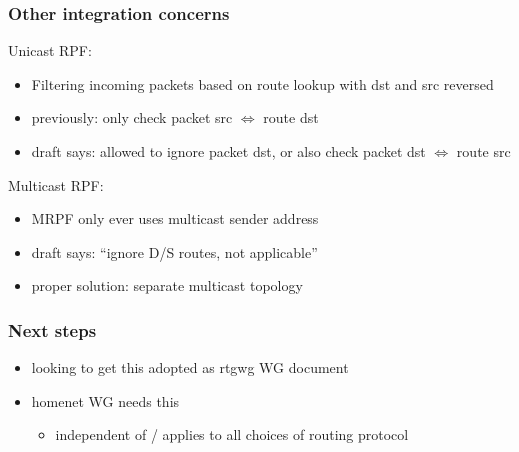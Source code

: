 \documentclass[14pt]{beamer}
\begin{document}
\begin{frame}
  \frametitle{Other integration concerns}

  Unicast RPF:
  \begin{itemize}
    \item Filtering incoming packets based on route lookup with dst and src reversed
    \item previously: only check packet src $\Leftrightarrow$ route dst
    \item draft says: allowed to ignore packet dst, or also check packet dst $\Leftrightarrow$ route src
  \end{itemize}
  \vspace{5mm}
  Multicast RPF:
  \begin{itemize}
    \item MRPF only ever uses multicast sender address
    \item draft says: ``ignore D/S routes, not applicable''
    \item proper solution: separate multicast topology
  \end{itemize}
\end{frame}

\begin{frame}
  \frametitle{Next steps}
  \begin{itemize}
    \item looking to get this adopted as rtgwg WG document
    \item homenet WG needs this
    \begin{itemize}
      \item independent of / applies to all choices of routing protocol
    \end{itemize}
  \end{itemize}
\end{frame}
\end{document}
